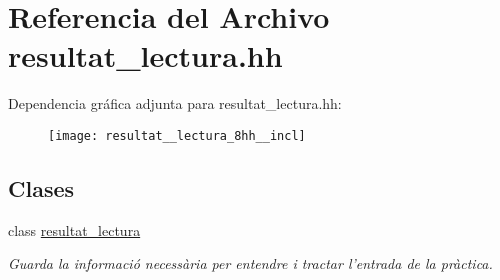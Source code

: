 \hypertarget{resultat__lectura_8hh}{}\section{Referencia del Archivo resultat\+\_\+lectura.\+hh}
\label{resultat__lectura_8hh}
Dependencia gráfica adjunta para resultat\+\_\+lectura.\+hh\+:\nopagebreak
\begin{figure}[H]
\begin{center}
\leavevmode
\texttt{[image: resultat\_\_lectura\_8hh\_\_incl]}
\end{center}
\end{figure}
\subsection*{Clases}
\begin{DoxyCompactItemize}
\item 
class \hyperlink{classresultat__lectura}{resultat\+\_\+lectura}
\begin{DoxyCompactList}\small\item\em Guarda la informació necessària per entendre i tractar l’entrada de la pràctica. \end{DoxyCompactList}\end{DoxyCompactItemize}
